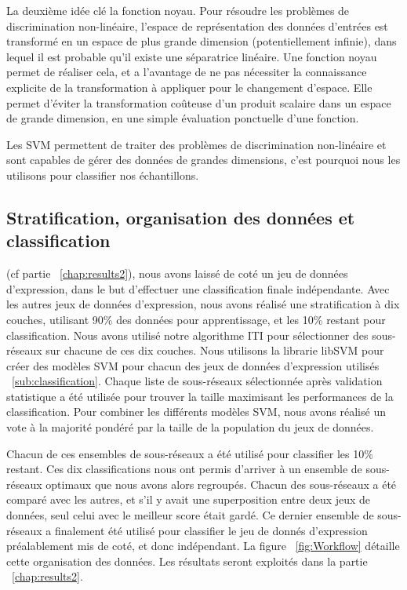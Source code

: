 			La deuxième idée clé la fonction noyau.
			Pour résoudre les problèmes de discrimination non-linéaire, l'espace de représentation des données d'entrées est transformé en un espace de plus grande dimension (potentiellement infinie), dans lequel il est probable qu'il existe une séparatrice linéaire.
			Une fonction noyau permet de réaliser cela, et a l'avantage de ne pas nécessiter la connaissance explicite de la transformation à appliquer pour le changement d'espace.
			Elle permet d'éviter la transformation coûteuse d'un produit scalaire dans un espace de grande dimension, en une simple évaluation ponctuelle d'une fonction.

			Les \ac{SVM} permettent de traiter des problèmes de discrimination non-linéaire et sont capables de gérer des données de grandes dimensions, c'est pourquoi nous les utilisons pour classifier nos échantillons.

		\subsection{\textcolor{green!45!black}{Stratification, organisation des données et classification}}
			 (cf partie ~\ref{chap:results2}), nous avons laissé de coté un jeu de données d'expression, dans le but d'effectuer une classification finale indépendante.
			Avec les autres jeux de données d'expression, nous avons réalisé une stratification à dix couches, utilisant 90\% des données pour apprentissage, et les 10\% restant pour classification.
			Nous avons utilisé notre algorithme ITI pour sélectionner des sous-réseaux sur chacune de ces dix couches.
			Nous utilisons la librarie libSVM pour créer des modèles \ac{SVM} pour chacun des jeux de données d'expression utilisés ~\ref{sub:classification}.
			Chaque liste de sous-réseaux sélectionnée après validation statistique a été utilisée pour trouver la taille maximisant les performances de la classification.
			Pour combiner les différents modèles \ac{SVM}, nous avons réalisé un vote à la majorité pondéré par la taille de la population du jeux de données.

			Chacun de ces ensembles de sous-réseaux a été utilisé pour classifier les 10\% restant.
			Ces dix classifications nous ont permis d'arriver à un ensemble de sous-réseaux optimaux que nous avons alors regroupés.
			Chacun des sous-réseaux a été comparé avec les autres, et s'il y avait une superposition entre deux jeux de données, seul celui avec le meilleur score était gardé.
			Ce dernier ensemble de sous-réseaux a finalement été utilisé pour classifier le jeu de donnés d'expression préalablement mis de coté, et donc indépendant.
			La figure ~\ref{fig:Workflow} détaille cette organisation des données.
			Les résultats seront exploités dans la partie ~\ref{chap:results2}.

